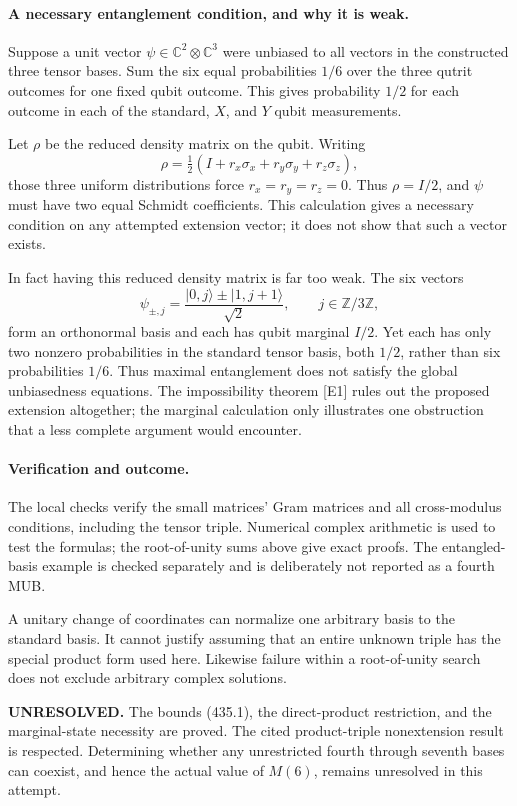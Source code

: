 \documentclass[11pt]{article}
\begin{document}
\paragraph{A necessary entanglement condition, and why it is weak.}
Suppose a unit vector $\psi\in\mathbb C^2\otimes\mathbb C^3$ were unbiased to all vectors in the constructed three tensor bases. Sum the six equal probabilities $1/6$ over the three qutrit outcomes for one fixed qubit outcome. This gives probability $1/2$ for each outcome in each of the standard, $X$, and $Y$ qubit measurements.

Let $\rho$ be the reduced density matrix on the qubit. Writing
\[
 \rho=\tfrac12(I+r_x\sigma_x+r_y\sigma_y+r_z\sigma_z),
\]
those three uniform distributions force $r_x=r_y=r_z=0$. Thus $\rho=I/2$, and $\psi$ must have two equal Schmidt coefficients. This calculation gives a necessary condition on any attempted extension vector; it does not show that such a vector exists.

In fact having this reduced density matrix is far too weak. The six vectors
\[
 \psi_{\pm,j}=\frac{|0,j\rangle\pm|1,j+1\rangle}{\sqrt2},
 \qquad j\in\mathbb Z/3\mathbb Z,
\]
form an orthonormal basis and each has qubit marginal $I/2$. Yet each has only two nonzero probabilities in the standard tensor basis, both $1/2$, rather than six probabilities $1/6$. Thus maximal entanglement does not satisfy the global unbiasedness equations. The impossibility theorem [E1] rules out the proposed extension altogether; the marginal calculation only illustrates one obstruction that a less complete argument would encounter.

\paragraph{Verification and outcome.}
The local checks verify the small matrices' Gram matrices and all cross-modulus conditions, including the tensor triple. Numerical complex arithmetic is used to test the formulas; the root-of-unity sums above give exact proofs. The entangled-basis example is checked separately and is deliberately not reported as a fourth MUB.

A unitary change of coordinates can normalize one arbitrary basis to the standard basis. It cannot justify assuming that an entire unknown triple has the special product form used here. Likewise failure within a root-of-unity search does not exclude arbitrary complex solutions.

\textbf{UNRESOLVED.} The bounds (435.1), the direct-product restriction, and the marginal-state necessity are proved. The cited product-triple nonextension result is respected. Determining whether any unrestricted fourth through seventh bases can coexist, and hence the actual value of $M(6)$, remains unresolved in this attempt.
\end{document}
